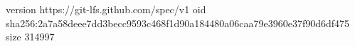 version https://git-lfs.github.com/spec/v1
oid sha256:2a7a58deee7dd3becc9593c468f1d90a184480a06caa79e3960e37f90d6df475
size 314997
